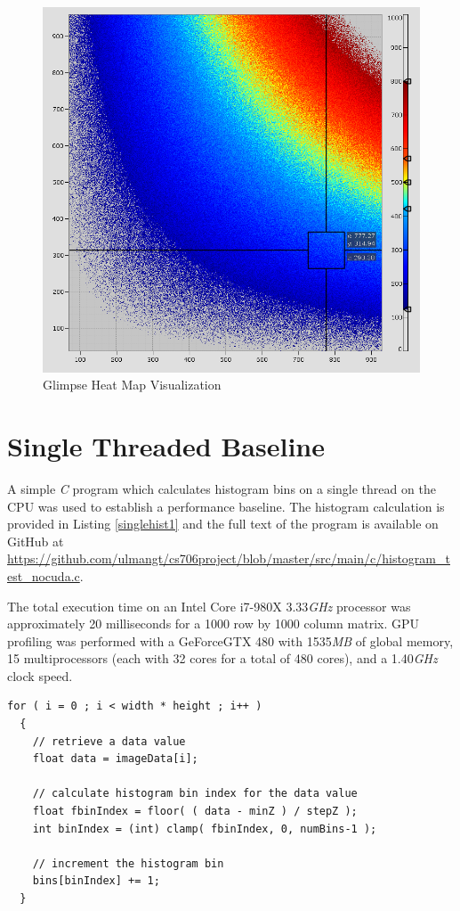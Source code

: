 \documentclass{article}
\begin{document}
\begin{figure}
\centering
\includegraphics[width=1.0\textwidth]{screenshots/glimpse/TaggedHeatMapExample.png}
\caption{Glimpse Heat Map Visualization\cite{glimpse.com}}
\label{heatmap}
\end{figure}

\section{Single Threaded Baseline}\label{baseline}

A simple \emph{C} program which calculates histogram bins on a single thread on the CPU was used to establish a performance baseline. The histogram calculation is provided in Listing \ref{singlehist1} and the full text of the program is available on GitHub at \url{https://github.com/ulmangt/cs706project/blob/master/src/main/c/histogram_test_nocuda.c}.

The total execution time on an Intel Core i7-980X 3.33\emph{GHz} processor was approximately 20 milliseconds for a 1000 row by 1000 column matrix. GPU profiling was performed with a GeForceGTX 480 with 1535\emph{MB} of global memory, 15 multiprocessors (each with 32 cores for a total of 480 cores), and a 1.40\emph{GHz} clock speed\cite{geforce480}.

\lstset{language=C,basicstyle=\footnotesize}
\begin{minipage}{\textwidth}
\begin{lstlisting}[caption={Single Threaded Histogram Calculation},label={singlehist1}]
  for ( i = 0 ; i < width * height ; i++ )
  {
    // retrieve a data value
    float data = imageData[i];

    // calculate histogram bin index for the data value
    float fbinIndex = floor( ( data - minZ ) / stepZ );
    int binIndex = (int) clamp( fbinIndex, 0, numBins-1 );

    // increment the histogram bin
    bins[binIndex] += 1;
  }
\end{lstlisting}
\end{minipage}
\end{document}
